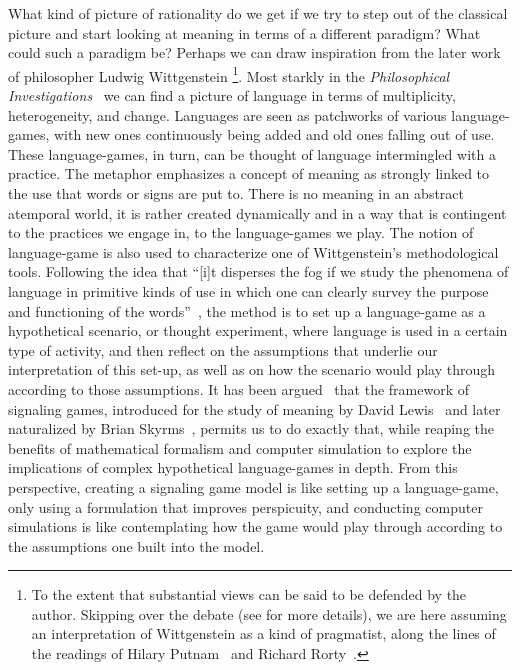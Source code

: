 \documentclass[a4paper]{article}
\begin{document}
What kind of picture of rationality do we get if we try to step out of the classical picture and start looking at meaning in terms of a different paradigm?
What could such a paradigm be?
Perhaps we can draw inspiration from the later work of philosopher Ludwig Wittgenstein%
\footnote{To the extent that substantial views can be said to be defended by the author. Skipping over the debate (see \cite{kahane_wittgenstein_2007} for more details), we are here assuming an interpretation of Wittgenstein as a kind of pragmatist, along the lines of the readings of Hilary Putnam~\parencite*{putnam_pragmatism_1994} and Richard Rorty~\parencite*{rorty_wittgenstein_2007}.}.
Most starkly in the \emph{Philosophical Investigations}~\parencite*{wittgenstein_philosophical_1953} we can find a picture of language in terms of multiplicity, heterogeneity, and change.
Languages are seen as patchworks of various language-games, with new ones continuously being added and old ones falling out of use.
These language-games, in turn, can be thought of language intermingled with a practice.
The metaphor emphasizes a concept of meaning as strongly linked to the use that words or signs are put to.
There is no meaning in an abstract atemporal world, it is rather created dynamically and in a way that is contingent to the practices we engage in, to the language-games we play.
The notion of language-game is also used to characterize one of Wittgenstein's methodological tools.
Following the idea that ``[i]t disperses the fog if we study the phenomena of language in primitive kinds of use in which one can clearly survey the purpose and functioning of the words''~\parencite*[\S 5]{wittgenstein_philosophical_1953}, the method is to set up a language-game as a hypothetical scenario, or thought experiment, where language is used in a certain type of activity, and then reflect on the assumptions that underlie our interpretation of this set-up, as well as on how the scenario would play through according to those assumptions.
It has been argued~\parencite{correia_bivalent_2013} that the framework of signaling games, introduced for the study of meaning by David Lewis~\parencite*{lewis_convention_1969} and later naturalized by Brian Skyrms~\parencite*{skyrms_evolution_1996,skyrms_signals_2010}, permits us to do exactly that, while reaping the benefits of mathematical formalism and computer simulation to explore the implications of complex hypothetical language-games in depth.
From this perspective, creating a signaling game model is like setting up a language-game, only using a formulation that improves perspicuity, and conducting computer simulations is like contemplating how the game would play through according to the assumptions one built into the model.
\end{document}
